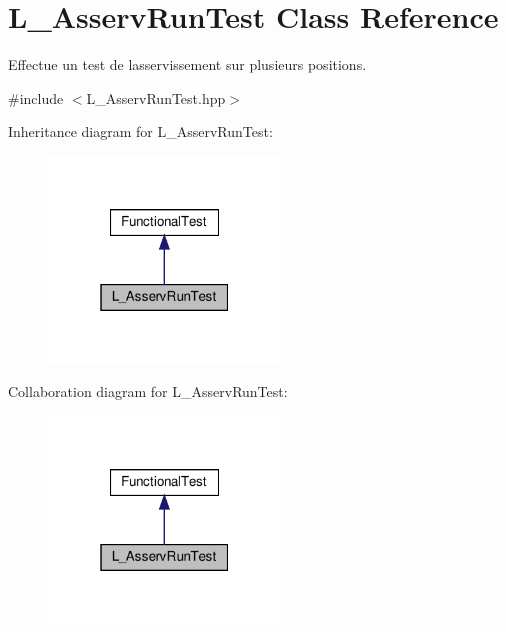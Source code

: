 \hypertarget{classL__AsservRunTest}{}\section{L\+\_\+\+Asserv\+Run\+Test Class Reference}
\label{classL__AsservRunTest}


Effectue un test de l\textquotesingle{}asservissement sur plusieurs positions.  




{\ttfamily \#include $<$L\+\_\+\+Asserv\+Run\+Test.\+hpp$>$}



Inheritance diagram for L\+\_\+\+Asserv\+Run\+Test\+:
\nopagebreak
\begin{figure}[H]
\begin{center}
\leavevmode
\includegraphics[width=175pt]{classL__AsservRunTest__inherit__graph}
\end{center}
\end{figure}


Collaboration diagram for L\+\_\+\+Asserv\+Run\+Test\+:
\nopagebreak
\begin{figure}[H]
\begin{center}
\leavevmode
\includegraphics[width=175pt]{classL__AsservRunTest__coll__graph}
\end{center}
\end{figure}
